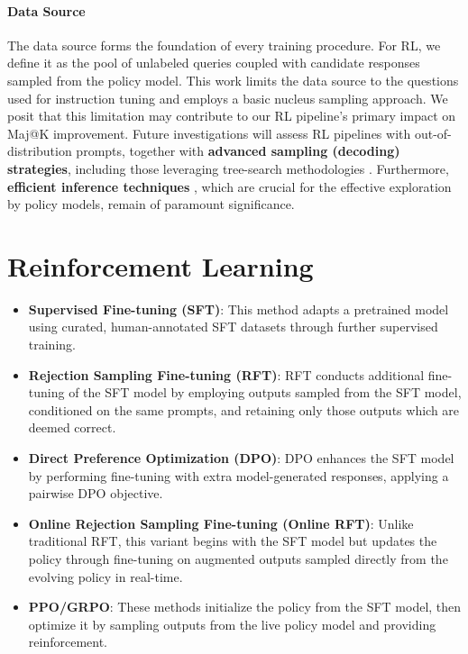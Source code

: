 \paragraph{Data Source} The data source forms the foundation of every training procedure. For RL, we define it as the pool of unlabeled queries coupled with candidate responses sampled from the policy model. This work limits the data source to the questions used for instruction tuning and employs a basic nucleus sampling approach. We posit that this limitation may contribute to our RL pipeline’s primary impact on Maj@K improvement. Future investigations will assess RL pipelines with out-of-distribution prompts, together with \textbf{advanced sampling (decoding) strategies}, including those leveraging tree-search methodologies \citep{yao2023tree}. Furthermore, \textbf{efficient inference techniques} \citep{xia-etal-2023-speculative,leviathan2023fast,kwon2023efficient,xia2024unlocking}, which are crucial for the effective exploration by policy models, remain of paramount significance.

\section{Reinforcement Learning}

\begin{itemize}
    \item  \textbf{Supervised Fine-tuning (SFT)}: This method adapts a pretrained model using curated, human-annotated SFT datasets through further supervised training.
    \item \textbf{Rejection Sampling Fine-tuning (RFT)}: RFT conducts additional fine-tuning of the SFT model by employing outputs sampled from the SFT model, conditioned on the same prompts, and retaining only those outputs which are deemed correct.
    \item \textbf{Direct Preference Optimization (DPO)}: DPO enhances the SFT model by performing fine-tuning with extra model-generated responses, applying a pairwise DPO objective.
    \item \textbf{Online Rejection Sampling Fine-tuning (Online RFT)}: Unlike traditional RFT, this variant begins with the SFT model but updates the policy through fine-tuning on augmented outputs sampled directly from the evolving policy in real-time.
    \item \textbf{PPO/GRPO}: These methods initialize the policy from the SFT model, then optimize it by sampling outputs from the live policy model and providing reinforcement.
\end{itemize}

